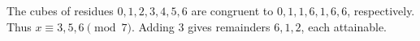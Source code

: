 The cubes of residues $0,1,2,3,4,5,6$ are congruent to $0,1,1,6,1,6,6$, respectively. Thus $x\equiv3,5,6\pmod7$. Adding $3$ gives remainders $\boxed{6,1,2}$, each attainable.
